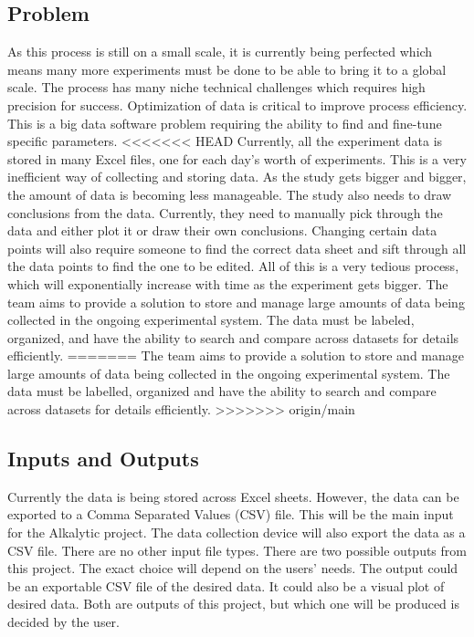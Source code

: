 \documentclass{article}
\begin{document}
\subsection{Problem}
As this process is still on a small scale, it is currently being perfected which
means many more experiments must be done to be able to bring it to a global
scale. The process has many niche technical challenges which requires high
precision for success. Optimization of data is critical to improve process
efficiency. This is a big data software problem requiring the ability to find
and fine-tune specific parameters. \newline \newline
<<<<<<< HEAD
Currently, all the experiment data is stored in many Excel files, one for each
day's worth of experiments. This is a very inefficient way of collecting and
storing data. As the study gets bigger and bigger, the amount of data is
becoming less manageable. The study also needs to draw conclusions from the
data. Currently, they need to manually pick through the data and either plot it
or draw their own conclusions. Changing certain data points will also require
someone to find the correct data sheet and sift through all the data points to
find the one to be edited. All of this is a very tedious process, which will
exponentially increase with time as the experiment gets bigger. The team aims to
provide a solution to store and manage large amounts of data being collected in
the ongoing experimental system. The data must be labeled, organized, and have
the ability to search and compare across datasets for details efficiently.
=======
The team aims to provide a solution to store and manage large amounts of data
being collected in the ongoing experimental system. The data must be labelled,
organized and have the ability to search and compare across datasets for details
efficiently.
>>>>>>> origin/main

\subsection{Inputs and Outputs}
Currently the data is being stored across Excel sheets. However, the data can be
exported to a Comma Separated Values (CSV) file. This will be the main input for
the Alkalytic project. The data collection device will also export the data as a
CSV file. There are no other input file types.
\newline
\newline
There are two possible outputs from this project. The exact choice will depend
on the users' needs. The output could be an exportable CSV file of the desired
data. It could also be a visual plot of desired data. Both are outputs of this
project, but which one will be produced is decided by the user.
\end{document}

